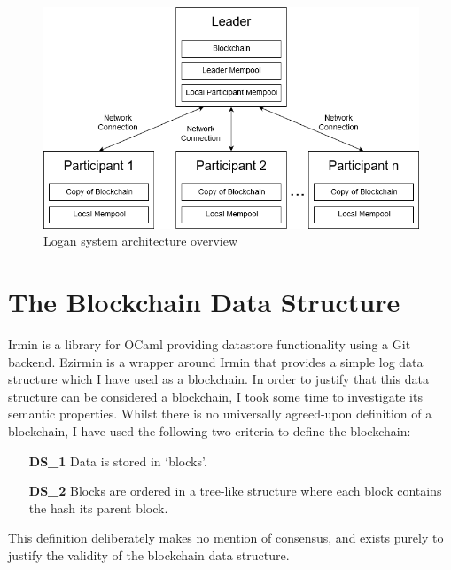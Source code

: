 \documentclass[12pt,a4paper,twoside,openright]{report}
\begin{document}
	\begin{figure}
		\centering
		\includegraphics[width=16cm]{figs/System_Architecture.png}
		\caption{Logan system architecture overview}
		\label{fig:sysarch}
	\end{figure}

	\section{The Blockchain Data Structure}\label{sec:datastructure}
	Irmin  \parencite{Irmin} is a library for OCaml providing datastore functionality using a Git backend.
	Ezirmin is a wrapper around Irmin that provides a simple log data structure which I have used as a blockchain.
	In order to justify that this data structure can be considered a blockchain, I took some time to investigate its semantic properties. 
	Whilst there is no universally agreed-upon definition of a blockchain, I have used the following two criteria to define the blockchain:
	\begin{enumerate}
		\setlength{\itemindent}{2em}
			\item[\textbf{DS\_1}] Data is stored in `blocks'.
			\item[\textbf{DS\_2}] Blocks are ordered in a tree-like structure where each block contains the hash its parent block.
	\end{enumerate}
	This definition deliberately makes no mention of consensus, and exists purely to justify the validity of the blockchain data structure.
\end{document}
